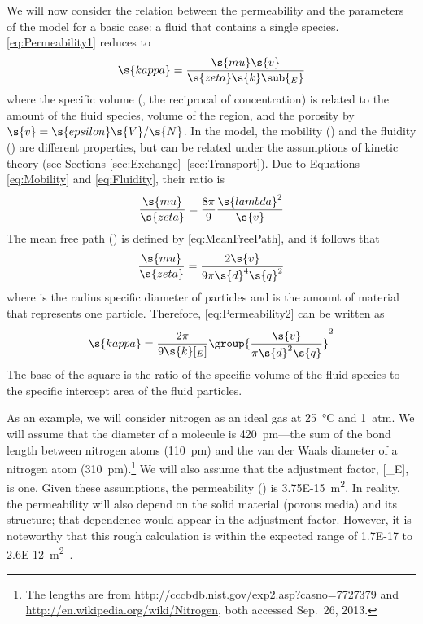 We will now consider the relation between the permeability and the parameters of the model for a basic case: a fluid that contains a single species.  \autoref{eq:Permeability1} reduces to
\begin{equation}
  \label{eq:Permeability2}
  \s{kappa} = \frac{\s{mu}\s{v}}{\s{zeta}\s{k}\sub{_E}}
\end{equation}
where the specific volume (, the reciprocal of concentration) is related to the amount of the fluid species, volume of the region, and the porosity by $\s{v} = \s{epsilon}\s{V}/\s{N}$.  In the model, the mobility () and the fluidity () are different properties, but can be related under the assumptions of kinetic theory (see Sections \ref{sec:Exchange}--\ref{sec:Transport}).  Due to Equations \ref{eq:Mobility} and \ref{eq:Fluidity}, their ratio is
\begin{equation}
  \frac{\s{mu}}{\s{zeta}} = \frac{8\pi}{9}\frac{\s{lambda}^2}{\s{v}}
\end{equation}
The mean free path () is defined by \autoref{eq:MeanFreePath}, and it follows that
\begin{equation}
  \frac{\s{mu}}{\s{zeta}} = \frac{2\s{v}}{9\pi\s{d}^4\s{q}^2}
\end{equation}
where  is the radius specific diameter of particles and  is the amount of material that represents one particle.  Therefore, \autoref{eq:Permeability2} can be written as
\begin{equation}
  \label{eq:Permeability3}
  \s{kappa} = \frac{2\pi}{9\s{k}[_E]}\group{\frac{\s{v}}{\pi\s{d}^2\s{q}}}^2
\end{equation}
The base of the square is the ratio of the specific volume of the fluid species to the specific intercept area of the fluid particles.

As an example, we will consider nitrogen as an ideal gas at \SI{25}{\celsius} and \SI{1}{atm}.  We will assume that the diameter of a  molecule is \SI{420}{pm}---the sum of the bond length between nitrogen atoms (\SI{110}{pm}) and the van der Waals diameter of a nitrogen atom (\SI{310}{pm}).\footnote{The lengths are from \url{http://cccbdb.nist.gov/exp2.asp?casno=7727379} and \url{http://en.wikipedia.org/wiki/Nitrogen}, both accessed Sep.~26, 2013.}  We will also assume that the adjustment factor, [_E], is one.  Given these assumptions, the permeability () is \SI{3.75E-15}{m^2}.  In reality, the permeability will also depend on the solid material (porous media) and its structure; that dependence would appear in the adjustment factor.  However, it is noteworthy that this rough calculation is within the expected range of \num{1.7E-17} to \SI{2.6E-12}{m^2}~\cite{Bloomfield1995}.


